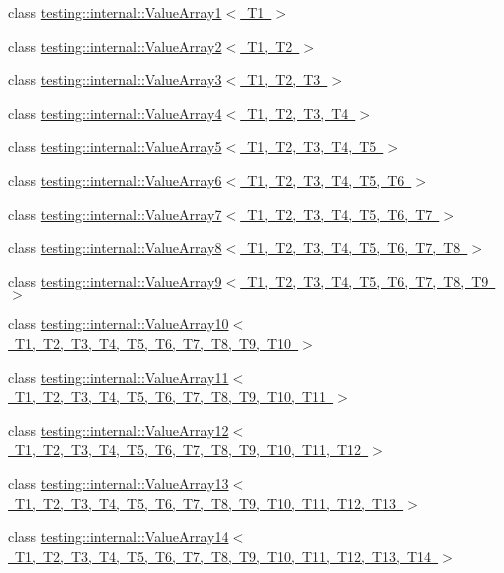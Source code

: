\begin{DoxyCompactItemize}
\item 
class \mbox{\hyperlink{classtesting_1_1internal_1_1ValueArray1}{testing\+::internal\+::\+Value\+Array1$<$ T1 $>$}}
\item 
class \mbox{\hyperlink{classtesting_1_1internal_1_1ValueArray2}{testing\+::internal\+::\+Value\+Array2$<$ T1, T2 $>$}}
\item 
class \mbox{\hyperlink{classtesting_1_1internal_1_1ValueArray3}{testing\+::internal\+::\+Value\+Array3$<$ T1, T2, T3 $>$}}
\item 
class \mbox{\hyperlink{classtesting_1_1internal_1_1ValueArray4}{testing\+::internal\+::\+Value\+Array4$<$ T1, T2, T3, T4 $>$}}
\item 
class \mbox{\hyperlink{classtesting_1_1internal_1_1ValueArray5}{testing\+::internal\+::\+Value\+Array5$<$ T1, T2, T3, T4, T5 $>$}}
\item 
class \mbox{\hyperlink{classtesting_1_1internal_1_1ValueArray6}{testing\+::internal\+::\+Value\+Array6$<$ T1, T2, T3, T4, T5, T6 $>$}}
\item 
class \mbox{\hyperlink{classtesting_1_1internal_1_1ValueArray7}{testing\+::internal\+::\+Value\+Array7$<$ T1, T2, T3, T4, T5, T6, T7 $>$}}
\item 
class \mbox{\hyperlink{classtesting_1_1internal_1_1ValueArray8}{testing\+::internal\+::\+Value\+Array8$<$ T1, T2, T3, T4, T5, T6, T7, T8 $>$}}
\item 
class \mbox{\hyperlink{classtesting_1_1internal_1_1ValueArray9}{testing\+::internal\+::\+Value\+Array9$<$ T1, T2, T3, T4, T5, T6, T7, T8, T9 $>$}}
\item 
class \mbox{\hyperlink{classtesting_1_1internal_1_1ValueArray10}{testing\+::internal\+::\+Value\+Array10$<$ T1, T2, T3, T4, T5, T6, T7, T8, T9, T10 $>$}}
\item 
class \mbox{\hyperlink{classtesting_1_1internal_1_1ValueArray11}{testing\+::internal\+::\+Value\+Array11$<$ T1, T2, T3, T4, T5, T6, T7, T8, T9, T10, T11 $>$}}
\item 
class \mbox{\hyperlink{classtesting_1_1internal_1_1ValueArray12}{testing\+::internal\+::\+Value\+Array12$<$ T1, T2, T3, T4, T5, T6, T7, T8, T9, T10, T11, T12 $>$}}
\item 
class \mbox{\hyperlink{classtesting_1_1internal_1_1ValueArray13}{testing\+::internal\+::\+Value\+Array13$<$ T1, T2, T3, T4, T5, T6, T7, T8, T9, T10, T11, T12, T13 $>$}}
\item 
class \mbox{\hyperlink{classtesting_1_1internal_1_1ValueArray14}{testing\+::internal\+::\+Value\+Array14$<$ T1, T2, T3, T4, T5, T6, T7, T8, T9, T10, T11, T12, T13, T14 $>$}}

\end{DoxyCompactItemize}
